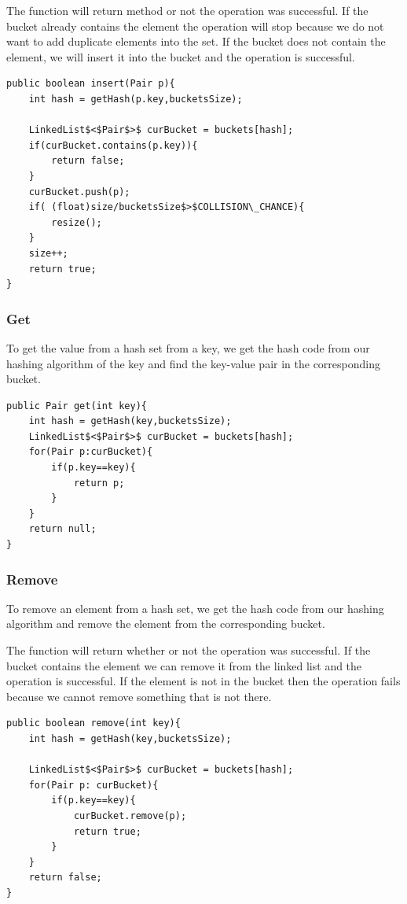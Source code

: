 \documentclass[11pt,oneside]{book}
\begin{document}
The function will return method or not the operation was successful. If the bucket already contains the element the operation will stop because we do not want to add duplicate elements into the set. If the bucket does not contain the element, we will insert it into the bucket and the operation is successful.

\begin{lstlisting}
public boolean insert(Pair p){
    int hash = getHash(p.key,bucketsSize);
    
    LinkedList$<$Pair$>$ curBucket = buckets[hash];
    if(curBucket.contains(p.key)){
        return false;
    }
    curBucket.push(p);
    if( (float)size/bucketsSize$>$COLLISION\_CHANCE){
        resize();
    }
    size++;
    return true;
}
\end{lstlisting}

\subsubsection{Get}

To get the value from a hash set from a key, we get the hash code from our hashing algorithm of the key and find the key-value pair in the corresponding bucket.

\begin{lstlisting}
public Pair get(int key){
    int hash = getHash(key,bucketsSize);
    LinkedList$<$Pair$>$ curBucket = buckets[hash];
    for(Pair p:curBucket){
        if(p.key==key){
            return p;
        }
    }
    return null;
}
\end{lstlisting}

\subsubsection{Remove}

To remove an element from a hash set, we get the hash code from our hashing algorithm and remove the element from the corresponding bucket.

The function will return whether or not the operation was successful. If the bucket contains the element we can remove it from the linked list and the operation is successful. If the element is not in the bucket then the operation fails because we cannot remove something that is not there.

\begin{lstlisting}
public boolean remove(int key){
    int hash = getHash(key,bucketsSize);
    
    LinkedList$<$Pair$>$ curBucket = buckets[hash];
    for(Pair p: curBucket){
        if(p.key==key){
            curBucket.remove(p);
            return true;
        }
    }
    return false;
}
\end{lstlisting}
\end{document}
